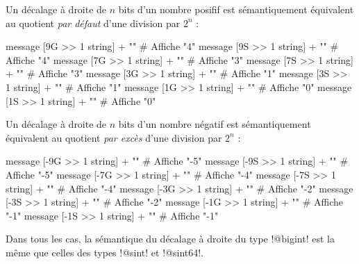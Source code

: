 Un décalage à droite de $n$ bits d'un nombre posifif est sémantiquement équivalent au quotient \emph{par défaut} d'une division par $2^n$ :

\begin{galgas}
  message [9G >> 1 string] + "\n" # Affiche "4"
  message [9S >> 1 string] + "\n" # Affiche "4"
  message [7G >> 1 string] + "\n" # Affiche "3"
  message [7S >> 1 string] + "\n" # Affiche "3"
  message [3G >> 1 string] + "\n" # Affiche "1"
  message [3S >> 1 string] + "\n" # Affiche "1"
  message [1G >> 1 string] + "\n" # Affiche "0"
  message [1S >> 1 string] + "\n" # Affiche "0"
\end{galgas}


Un décalage à droite de $n$ bits d'un nombre négatif est sémantiquement équivalent au quotient \emph{par excès} d'une division par $2^n$ :

\begin{galgas}
  message [-9G >> 1 string] + "\n" # Affiche "-5"
  message [-9S >> 1 string] + "\n" # Affiche "-5"
  message [-7G >> 1 string] + "\n" # Affiche "-4"
  message [-7S >> 1 string] + "\n" # Affiche "-4"
  message [-3G >> 1 string] + "\n" # Affiche "-2"
  message [-3S >> 1 string] + "\n" # Affiche "-2"
  message [-1G >> 1 string] + "\n" # Affiche "-1"
  message [-1S >> 1 string] + "\n" # Affiche "-1"
\end{galgas}

Dans tous les cas, la sémantique du décalage à droite du type \ggs!@bigint! est la même que celles des types \ggs!@sint! et \ggs!@sint64!.
